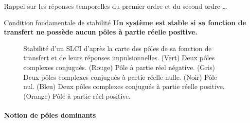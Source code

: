 Rappel sur les réponses temporelles du premier ordre et du second ordre \ldots
\acpl
\begin{criteria}{Condition fondamentale de stabilité}
    \textbf{Un système est stable si sa fonction de transfert ne possède aucun 
            pôles à partie réelle positive.}
\end{criteria}
\clearpage
\thispagestyle{empty}
\begin{landscape}
\centering
\captionsetup{width=1.15\linewidth}
\begin{figure}[!h]
    \centering
    
    \caption{Stabilité d'un SLCI d'après la carte des pôles de sa fonction de
             transfert et de leurs réponses impulsionnelles. 
             (Vert) Deux pôles complexes conjugués. 
             (Rouge) Pôle à partie réel négative. 
             (Gris) Deux pôles complexes conjugués à partie réelle nulle.
             (Noir) Pôle nul.
             (Bleu) Deux pôles complexes conjugués à partie réelle positive.
             (Orange) Pôle à partie réel positive.}
\end{figure}
\end{landscape}
\clearpage
\pagestyle{fancy}
\captionsetup{width=0.8\linewidth}


\paragraph{Notion de pôles dominants}

